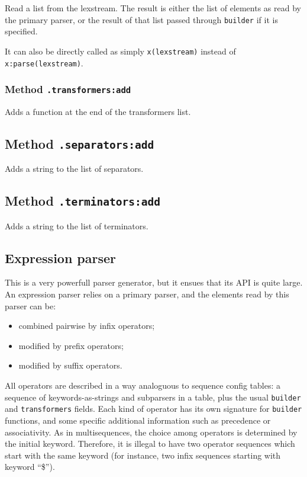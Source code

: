 Read a list from the lexstream. The result is either the list of elements
as read by the primary parser, or the result of that list passed
through \verb|builder| if it is specified.

It can also be directly called as simply \verb|x(lexstream)| instead of
\verb|x:parse(lexstream)|.

\subsubsection{Method {\tt .transformers:add}}
Adds a function at the end of the transformers list.

\subsection{Method {\tt .separators:add}}
Adds a string to the list of separators.

\subsection{Method {\tt .terminators:add}}
Adds a string to the list of terminators.

\subsection{Expression parser}

This is a very powerfull parser generator, but it ensues that its API
is quite large. An expression parser relies on a primary parser, and
the elements read by this parser can be:
\begin{itemize}
\item combined pairwise by infix operators;
\item modified by prefix operators;
\item modified by suffix operators.
\end{itemize}

All operators are described in a way analoguous to sequence config
tables: a sequence of keywords-as-strings and subparsers in a table,
plus the usual \verb|builder| and \verb|transformers|
fields. Each kind of operator has its own signature for \verb|builder|
functions, and some specific additional information such as precedence
or associativity. As in multisequences, the choice among operators is
determined by the initial keyword. Therefore, it is illegal to have
two operator sequences which start with the same keyword (for
instance, two infix sequences starting with keyword ``\$'').

